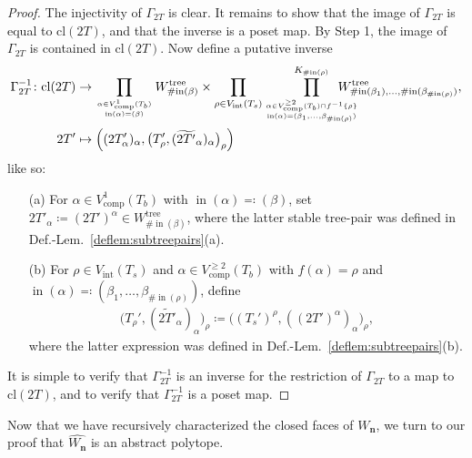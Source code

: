 \documentclass[11pt]{amsart}
\theoremstyle{definition}
\theoremstyle{remark}
\theoremstyle{plain}
\newcommand\bn{\mathbf{n}}
\newcommand{\on}{\operatorname}
\newcommand{\comp}{C^2}
\renewcommand{\comp}{{\on{comp}}}
\newcommand{\incom}{\on{in}}
\newcommand{\inte}{{\on{int}}}
\newcommand{\tree}{{\on{tree}}}
\newcommand{\cl}{\mathrm{cl}}
\newcommand{\wh}{\widehat}
\newcommand{\wt}{\widetilde}
\begin{document}
\begin{proof}
\medskip

\noindent The injectivity of $\Gamma_{2T}$ is clear.
It remains to show that the image of $\Gamma_{2T}$ is equal to $\cl(2T)$, and that the inverse is a poset map.
By Step 1, the image of $\Gamma_{2T}$ is contained in $\cl(2T)$.
Now define a putative inverse
\begin{align}
\Gamma_{2T}^{-1}\colon \cl(2T)
&\to
\prod_{
{\alpha \in V_\comp^1(T_b)}
\atop
{\incom(\alpha)=(\beta)}
} W_{\#\!\incom(\beta)}^\tree
\times
\prod_{\rho \in V_\inte(T_s)} \prod^{K_{\#\!\incom(\rho)}}_{
{\alpha\in V_\comp^{\geq2}(T_b)\cap f^{-1}\{\rho\}}
\atop
{\incom(\alpha)=(\beta_1,\ldots,\beta_{\#\!\incom(\rho)})}
}
\hspace{-0.25in} W^\tree_{\#\!\incom(\beta_1),\ldots,\#\!\incom(\beta_{\#\!\incom(\rho)})}, \\
2T' &\mapsto \Bigl((2T'_\alpha)_\alpha, \bigl(T'_\rho,(\wt{2T'}_\alpha)_\alpha\bigr)_\rho\Bigr)
\nonumber
\end{align}
like so:
\begin{itemize}
\item[(a)] For $\alpha \in V_\comp^1(T_b)$ with $\incom(\alpha)\eqqcolon(\beta)$, set $2T'_\alpha \coloneqq (2T')^\alpha \in W^\tree_{\#\!\incom(\beta)}$, where the latter stable tree-pair was defined in Def.-Lem.~\ref{deflem:subtreepairs}(a).

\item[(b)] For $\rho \in V_\inte(T_s)$ and $\alpha \in V_\comp^{\geq2}(T_b)$ with $f(\alpha)=\rho$ and $\incom(\alpha)\eqqcolon(\beta_1,\ldots,\beta_{\#\!\incom(\rho)})$, define
\begin{align}
\bigl(T_\rho',(\wt{2T'}_\alpha)_\alpha\bigr)_\rho
\coloneqq
\bigl((T_s')^\rho,((2T')^\alpha)_\alpha\bigr)_\rho,
\end{align}
where the latter expression was defined in Def.-Lem.~\ref{deflem:subtreepairs}(b).
\end{itemize}
It is simple to verify that $\Gamma_{2T}^{-1}$ is an inverse for the restriction of $\Gamma_{2T}$ to a map to $\cl(2T)$, and to verify that $\Gamma_{2T}^{-1}$ is a poset map.
\end{proof}

Now that we have recursively characterized the closed faces of $W_\bn$, we turn to our proof that $\wh{W_\bn}$ is an abstract polytope.


\end{document}
